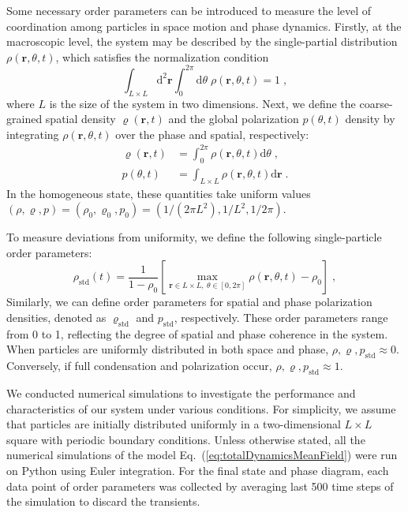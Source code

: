 \documentclass{article}
\begin{document}
Some necessary order parameters can be introduced to measure the level of coordination among particles in space motion and phase dynamics. Firstly, at the macroscopic level, the system may be described by the single-partial distribution $\rho \left( \mathbf{r},\theta ,t \right) $, which satisfies the normalization condition
\begin{equation}
    \int_{L\times L}{\mathrm{d}^2\mathbf{r}\int_0^{2\pi}{\mathrm{d}\theta \;\rho \left( \mathbf{r},\theta ,t \right)}}=1\;,
\end{equation}
where $L$ is the size of the system in two dimensions. Next, we define the coarse-grained spatial density $\varrho \left( \mathbf{r}, t \right) $ and the global polarization $p(\theta, t)$ density by integrating $\rho\left( \mathbf{r},\theta ,t \right)$ over the phase and spatial, respectively:
\begin{subequations}
    \begin{align}
        \varrho \left( \mathbf{r},t \right)& =\int_0^{2\pi}{\rho \left( \mathbf{r},\theta ,t \right) \mathrm{d}\theta}\;,\\
        p\left( \theta ,t \right) & =\int_{L\times L}{\rho \left( \mathbf{r},\theta ,t \right) \mathrm{d}\mathbf{r}}\;.
    \end{align}
\end{subequations}
In the homogeneous state, these quantities take uniform values $( \rho ,\varrho ,p ) =( \rho _0,\varrho _0,p_0 ) =( 1/\left( 2\pi L^2 \right) ,1/L^2,1/2\pi ) $.

To measure deviations from uniformity, we define the following single-particle order parameters:
\begin{equation}
    \rho _{\mathrm{std}}(t)=\frac{1}{1-\rho _0}\left[ \max_{\mathbf{r}\in L\times L,\ \theta \in \left[ 0,2\pi \right]} \rho \left( \mathbf{r},\theta ,t \right) -\rho _0 \right]  \;,
\end{equation}
Similarly, we can define order parameters for spatial and phase polarization densities, denoted as $\varrho _{\mathrm{std}}$ and $p_{\mathrm{std}}$, respectively.
These order parameters range from 0 to 1, reflecting the degree of spatial and phase coherence in the system. When particles are uniformly distributed in both space and phase, $\rho ,\varrho ,p_{\mathrm{std}} \approx 0$. Conversely, if full condensation and polarization occur, $\rho ,\varrho ,p_{\mathrm{std}}\approx 1$.

We conducted numerical simulations to investigate the performance and characteristics of our system under various conditions.
For simplicity, we assume that particles are initially distributed uniformly in a two-dimensional $L\times L$ square with periodic boundary conditions.
Unless otherwise stated, all the numerical simulations of the model Eq.~(\ref{eq:totalDynamicsMeanField}) were run on Python using Euler integration.
For the final state and phase diagram, each data point of order parameters was collected by averaging last 500 time steps of the simulation to discard the transients.
 
\end{document}
